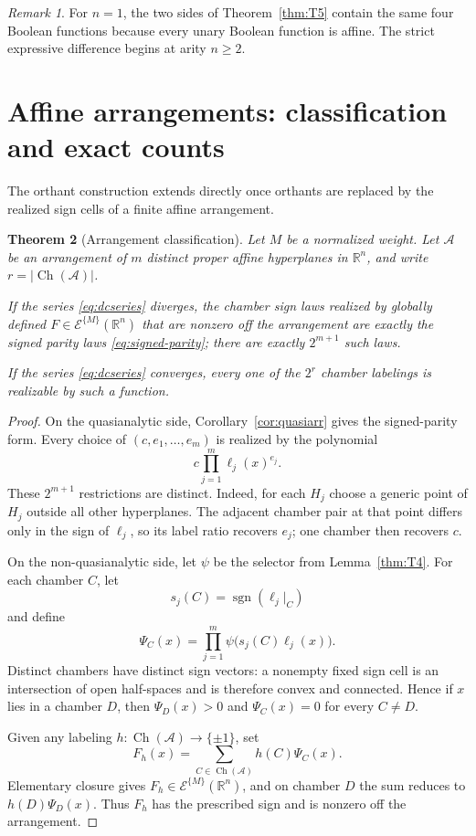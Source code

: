 \documentclass[11pt]{article}
\newtheorem{theorem}{Theorem}[section]
\theoremstyle{definition}
\theoremstyle{remark}
\newtheorem{remark}[theorem]{Remark}
\newcommand{\R}{\mathbb{R}}
\newcommand{\sign}{\operatorname{sgn}}
\newcommand{\Ch}{\operatorname{Ch}}
\newcommand{\cA}{\mathcal{A}}
\begin{document}
\begin{remark}
For $n=1$, the two sides of Theorem~\ref{thm:T5} contain the same four Boolean functions because every unary Boolean function is affine. The strict expressive difference begins at arity $n\ge2$.
\end{remark}

\section{Affine arrangements: classification and exact counts}\label{sec:arrangements}

The orthant construction extends directly once orthants are replaced by the realized sign cells of a finite affine arrangement.

\begin{theorem}[Arrangement classification]\label{thm:T6}
Let $M$ be a normalized weight. Let $\cA$ be an arrangement of $m$ distinct proper affine hyperplanes in $\R^n$, and write $r=|\Ch(\cA)|$.

If the series \eqref{eq:dcseries} diverges, the chamber sign laws realized by globally defined $F\in\mathcal{E}^{\{M\}}(\R^n)$ that are nonzero off the arrangement are exactly the signed parity laws \eqref{eq:signed-parity}; there are exactly $2^{m+1}$ such laws.

If the series \eqref{eq:dcseries} converges, every one of the $2^r$ chamber labelings is realizable by such a function.
\end{theorem}

\begin{proof}
On the quasianalytic side, Corollary~\ref{cor:quasiarr} gives the signed-parity form. Every choice of $(c,e_1,\dots,e_m)$ is realized by the polynomial
\[
 c\prod_{j=1}^m\ell_j(x)^{e_j}.
\]
These $2^{m+1}$ restrictions are distinct. Indeed, for each $H_j$ choose a generic point of $H_j$ outside all other hyperplanes. The adjacent chamber pair at that point differs only in the sign of $\ell_j$, so its label ratio recovers $e_j$; one chamber then recovers $c$.

On the non-quasianalytic side, let $\psi$ be the selector from Lemma~\ref{thm:T4}. For each chamber $C$, let
\[
 s_j(C)=\sign(\ell_j|_C)
\]
and define
\[
 \Psi_C(x)=\prod_{j=1}^m\psi\bigl(s_j(C)\ell_j(x)\bigr).
\]
Distinct chambers have distinct sign vectors: a nonempty fixed sign cell is an intersection of open half-spaces and is therefore convex and connected. Hence if $x$ lies in a chamber $D$, then $\Psi_D(x)>0$ and $\Psi_C(x)=0$ for every $C\ne D$.

Given any labeling $h:\Ch(\cA)\to\{\pm1\}$, set
\[
 F_h(x)=\sum_{C\in\Ch(\cA)} h(C)\Psi_C(x).
\]
Elementary closure gives $F_h\in\mathcal{E}^{\{M\}}(\R^n)$, and on chamber $D$ the sum reduces to $h(D)\Psi_D(x)$. Thus $F_h$ has the prescribed sign and is nonzero off the arrangement.
\end{proof}
\end{document}
